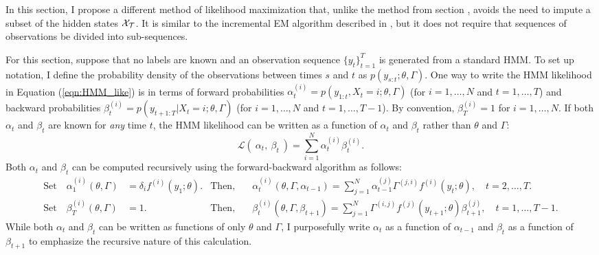 
In this section, I propose a different method of likelihood maximization that, unlike the method from section \label{ss:indep_wo_labels}, avoids the need to impute a subset of the hidden states $\mathcal{X}_{\mathcal{T}}$. It is similar to the incremental EM algorithm described in \citet{Gotoh:1998}, but it does not require that sequences of observations be divided into sub-sequences.

For this section, suppose that no labels are known and an observation sequence $\{y_t\}_{t=1}^T$ is generated from a standard HMM. To set up notation, I define the probability density of the observations between times $s$ and $t$ as $p(y_{s:t};\theta,\Gamma)$. One way to write the HMM likelihood in Equation (\ref{eqn:HMM_like}) is in terms of forward probabilities $\alpha^{(i)}_t = p(y_{1:t},X_t = i;\theta,\Gamma)$ (for $i = 1,\ldots,N$ and $t = 1,\ldots,T$) and backward probabilities $\beta^{(i)}_t = p(y_{t+1:T}|X_t = i;\theta,\Gamma)$ (for $i = 1,\ldots,N$ and $t = 1,\ldots,T-1$). By convention, $\beta^{(i)}_T = 1$ for $i = 1,\ldots,N$. If both $\alpha_t$ and $\beta_t$ are known for \textit{any} time $t$, the HMM likelihood can be written as a function of $\alpha_t$ and $\beta_t$ rather than $\theta$ and $\Gamma$:
%
\begin{equation*}
    \mathcal{L}(~\alpha_t,~\beta_t~) = \sum_{i=1}^N \alpha^{(i)}_t \beta^{(i)}_t.
\end{equation*}
%
Both $\alpha_t$ and $\beta_t$ can be computed recursively using the forward-backward algorithm as follows:
%
\begin{align}
    \text{Set} \quad \alpha_1^{(i)}(\theta,\Gamma) &= \delta_i f^{(i)}(y_1;\theta). & \text{Then,} \quad & \alpha_t^{(i)}(\theta,\Gamma,\alpha_{t-1}) = \sum_{j=1}^N \alpha_{t-1}^{(j)} \Gamma^{(j,i)} f^{(i)}(y_t;\theta), \quad t = 2,\ldots,T. \label{eqn:alpha}\\
    \text{Set} \quad \beta_T^{(i)}(\theta,\Gamma) &= 1. & \text{Then,} \quad & \beta_t^{(i)}(\theta,\Gamma,\beta_{t+1}) = \sum_{j=1}^N \Gamma^{(i,j)} f^{(j)}(y_{t+1};\theta) \beta^{(j)}_{t+1}, \quad t = 1,\ldots,T-1.
    \label{eqn:beta}
\end{align}
%
While both $\alpha_t$ and $\beta_t$ can be written as functions of only $\theta$ and $\Gamma$, I purposefully write $\alpha_t$ as a function of $\alpha_{t-1}$ and $\beta_t$ as a function of $\beta_{t+1}$ to emphasize the recursive nature of this calculation.

